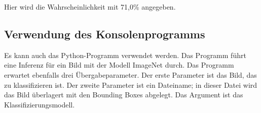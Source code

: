 \medskip




\medskip


Hier wird die Wahrscheinlichkeit mit 71,0\% angegeben.

\bigskip





%
%
%
%
%
%
%
%
%
%
%
%
%






\subsection{Verwendung des Konsolenprogramms }

Es kann auch das Python-Programm  verwendet werden. Das Programm führt eine Inferenz für ein Bild mit der Modell ImageNet durch. Das Programm erwartet ebenfalls drei Übergabeparameter. Der erste Parameter ist das Bild, das zu klassifizieren ist. Der zweite Parameter ist ein Dateiname; in dieser Datei wird das Bild überlagert mit den Bounding Boxes abgelegt. Das Argument ist das Klassifizierungsmodell. 


